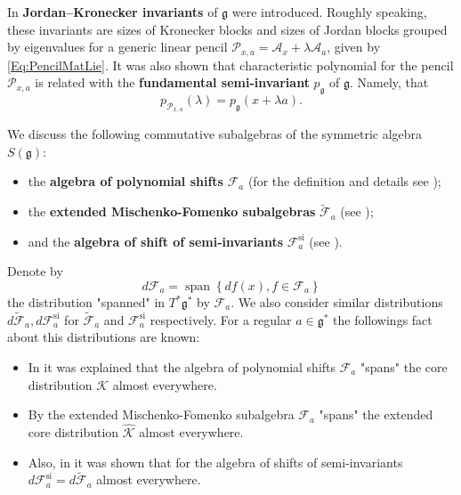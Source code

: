 \documentclass[12pt]{article}
\theoremstyle{definition}
\begin{document}
In \cite{BolsZhang} \textbf{Jordan--Kronecker invariants} of $\mathfrak{g}$ were introduced. Roughly speaking, these invariants are sizes of Kronecker blocks and sizes of Jordan blocks grouped by eigenvalues for a generic linear pencil $\mathcal{P}_{x,a} = \mathcal{A}_x + \lambda \mathcal{A}_a$, given by \eqref{Eq:PencilMatLie}. It was also shown that 
characteristic polynomial for the pencil $\mathcal{P}_{x,a}$ is related with the \textbf{fundamental semi-invariant} $p_{\mathfrak{g}}$ of $\mathfrak{g}$. Namely, that \[p_{\mathcal{P}_{x,a}}(\lambda) = p_{\mathfrak{g}}(x + \lambda a). \]


We discuss the following commutative subalgebras of the symmetric algebra $S(\mathfrak{g})$:

\begin{itemize}
    \item the \textbf{algebra of polynomial shifts}
$\mathcal{F}_a$ (for the definition and details see  \cite{BolsZhang});  \item the \textbf{extended Mischenko-Fomenko subalgebras} $\tilde{\mathcal{F}}_a$ (see \cite{Izosimov14}); 
    \item and the \textbf{algebra of shift of semi-invariants} $\mathcal{F}_{a}^{\textrm{si}}$ (see  \cite{Kozlov23Shift}).

\end{itemize}


Denote by
 \[ d\mathcal{F}_a = \operatorname{span} \left\{df(x), f \in \mathcal{F}_a \right\}\] the distribution "spanned" in $T^*\mathfrak{g}^*$ by $\mathcal{F}_a$. We also consider similar distributions $d\tilde{\mathcal{F}}_a, d\mathcal{F}_a^{\operatorname{si}}$ for $\tilde{\mathcal{F}}_a$ and $\mathcal{F}_a^{\operatorname{si}}$ respectively. For a regular $a \in \mathfrak{g}^*$ the followings fact about this distributions are known:


\begin{itemize}

\item In \cite[Section 5]{BolsZhang} it was explained that the algebra of polynomial shifts $\mathcal{F}_a$ "spans" the core distribution $\mathcal{K}$ almost everywhere.

\item By \cite[Proposition 5.1]{Izosimov14} the extended Mischenko-Fomenko subalgebra $\mathcal{F}_a$ "spans" the extended core distribution $\hat{\mathcal{K}}$  almost everywhere.

\item Also, in \cite{Kozlov23Shift} it was shown that for the algebra of shifts of semi-invariants $ d\mathcal{F}_a^{\operatorname{si}} = d\tilde{\mathcal{F}}_a$ almost everywhere.

\end{itemize}
\end{document}
